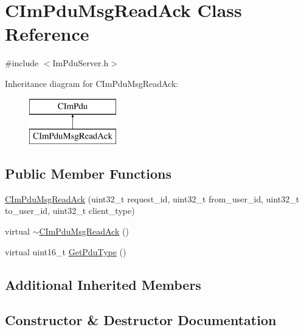 \hypertarget{class_c_im_pdu_msg_read_ack}{}\section{C\+Im\+Pdu\+Msg\+Read\+Ack Class Reference}
\label{class_c_im_pdu_msg_read_ack}


{\ttfamily \#include $<$Im\+Pdu\+Server.\+h$>$}

Inheritance diagram for C\+Im\+Pdu\+Msg\+Read\+Ack\+:\begin{figure}[H]
\begin{center}
\leavevmode
\includegraphics[height=2.000000cm]{class_c_im_pdu_msg_read_ack}
\end{center}
\end{figure}
\subsection*{Public Member Functions}
\begin{DoxyCompactItemize}
\item 
\hyperlink{class_c_im_pdu_msg_read_ack_a836a8f13e4909f5cc3d0e4088118e588}{C\+Im\+Pdu\+Msg\+Read\+Ack} (uint32\+\_\+t request\+\_\+id, uint32\+\_\+t from\+\_\+user\+\_\+id, uint32\+\_\+t to\+\_\+user\+\_\+id, uint32\+\_\+t client\+\_\+type)
\item 
virtual \hyperlink{class_c_im_pdu_msg_read_ack_a6fc6704e9c3a37bef886916a6788ca6f}{$\sim$\+C\+Im\+Pdu\+Msg\+Read\+Ack} ()
\item 
virtual uint16\+\_\+t \hyperlink{class_c_im_pdu_msg_read_ack_a9b2cc7502c321d5e9a22bd38b815ed03}{Get\+Pdu\+Type} ()
\end{DoxyCompactItemize}
\subsection*{Additional Inherited Members}


\subsection{Constructor \& Destructor Documentation}
\hypertarget{class_c_im_pdu_msg_read_ack_a836a8f13e4909f5cc3d0e4088118e588}{}
